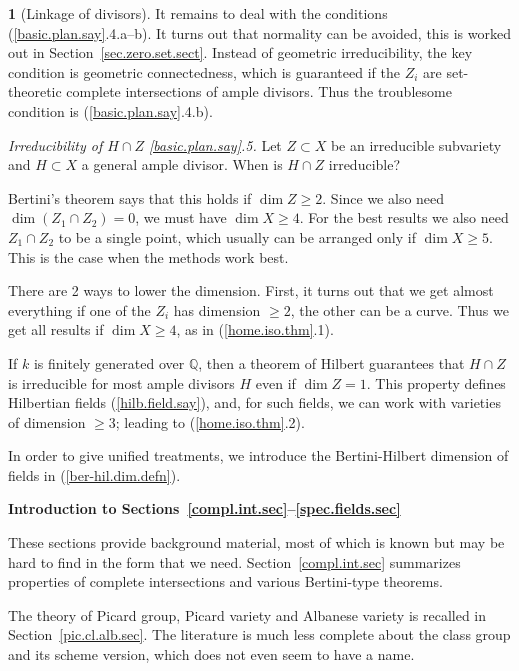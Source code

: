 \documentclass{amsart}
\theoremstyle{definition}
\newtheorem{say}[thm]{}
\theoremstyle{remark}
\newcommand{\q}[0]{{\mathbb Q}}
\begin{document}
\begin{say}[Linkage of divisors]
It remains to deal with the conditions (\ref{basic.plan.say}.4.a--b).
It turns out that  normality can be avoided,   this is worked out in Section~\ref{sec.zero.set.sect}.  Instead of geometric irreducibility,  the  key condition is geometric connectedness, which is guaranteed if the $Z_i$ are set-theoretic complete intersections of ample divisors. Thus the troublesome condition is (\ref{basic.plan.say}.4.b).
\medskip

{\it Irreducibility of   $H\cap Z$ \ref{basic.plan.say}.5.}
Let $Z\subset X$ be an irreducible subvariety and $H\subset X$ a general ample divisor. When is $H\cap Z$ irreducible?

Bertini's theorem says that this holds if $\dim Z\geq 2$. Since we also need
$\dim (Z_1\cap Z_2)=0$, we must have  $\dim X\geq 4$. For the best results we also need
$Z_1\cap Z_2$ to be a single point, which usually can be arranged only if
$\dim X\geq 5$. This is the case when the methods work best.

There are 2 ways to lower the dimension. First, it turns out that we get almost everything if one of the $Z_i$ has dimension $\geq 2$, the other can be a curve. Thus we get all results if $\dim X\geq 4$, as in (\ref{home.iso.thm}.1).

If $k$ is finitely generated over $\q$, then a theorem of Hilbert guarantees that $H\cap Z$ is irreducible for most ample divisors $H$ even if $\dim Z=1$.
This property defines Hilbertian fields (\ref{hilb.field.say}), and,   for such fields,  we can work with varieties of dimension $\geq 3$; leading to  (\ref{home.iso.thm}.2).


In order to give unified treatments, we  introduce the Bertini-Hilbert dimension of fields in (\ref{ber-hil.dim.defn}).


\end{say}




\medskip
{\bf Introduction to Sections~\ref{compl.int.sec}--\ref{spec.fields.sec}}
\medskip

These sections provide background material, most of which is known but may be hard to find in the form that we need. 
Section~\ref{compl.int.sec} summarizes properties of complete intersections and various Bertini-type theorems. 


The theory of Picard group, Picard variety and  Albanese variety is recalled in Section~\ref{pic.cl.alb.sec}. The literature is much less complete about the  class group and its scheme version, which does not even seem to have a name. 
\end{document}
